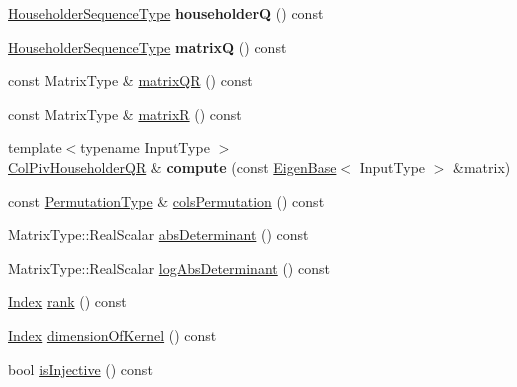 \begin{DoxyCompactItemize}
\item 
\mbox{\label{group___q_r___module_a5ae459d1937004ed45f77618dbad17db}} 
\hyperlink{group___householder___module_class_eigen_1_1_householder_sequence}{Householder\+Sequence\+Type} {\bfseries householderQ} () const
\item 
\mbox{\label{group___q_r___module_a8d7cb1ac2cbb00a283f59f6d26ae763c}} 
\hyperlink{group___householder___module_class_eigen_1_1_householder_sequence}{Householder\+Sequence\+Type} {\bfseries matrixQ} () const
\item 
const Matrix\+Type \& \hyperlink{group___q_r___module_aa572ac050c8d4fadd4f08a87f6b1e62b}{matrix\+QR} () const
\item 
const Matrix\+Type \& \hyperlink{group___q_r___module_a44c534d47bde6b67ce4b5247d142ef30}{matrixR} () const
\item 
\mbox{\label{group___q_r___module_a1cf5d190eae8bdea76a850a5374c4b0c}} 
{\footnotesize template$<$typename Input\+Type $>$ }\\\hyperlink{group___q_r___module_class_eigen_1_1_col_piv_householder_q_r}{Col\+Piv\+Householder\+QR} \& {\bfseries compute} (const \hyperlink{group___core___module_struct_eigen_1_1_eigen_base}{Eigen\+Base}$<$ Input\+Type $>$ \&matrix)
\item 
const \hyperlink{group___core___module}{Permutation\+Type} \& \hyperlink{group___q_r___module_ab6ad43e6a6fb75726eae0d5499948f4a}{cols\+Permutation} () const
\item 
Matrix\+Type\+::\+Real\+Scalar \hyperlink{group___q_r___module_aa02e3a293e50b3cf13adb94575db26f5}{abs\+Determinant} () const
\item 
Matrix\+Type\+::\+Real\+Scalar \hyperlink{group___q_r___module_a61f28ab7e00c11ae1a95d9a9bca0f963}{log\+Abs\+Determinant} () const
\item 
\hyperlink{namespace_eigen_a62e77e0933482dafde8fe197d9a2cfde}{Index} \hyperlink{group___q_r___module_a2a59aaa689613ce5ef0c9130ad33940e}{rank} () const
\item 
\hyperlink{namespace_eigen_a62e77e0933482dafde8fe197d9a2cfde}{Index} \hyperlink{group___q_r___module_a7c9294565d179226133770160b827be1}{dimension\+Of\+Kernel} () const
\item 
bool \hyperlink{group___q_r___module_a0031998053c9c7345c9458f7443aa263}{is\+Injective} () const
\item 

\end{DoxyCompactItemize}
